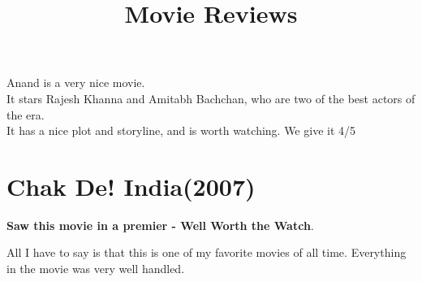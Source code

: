 \documentclass[11pt]{article}
\title{\textbf{Movie Reviews}}
\author{}
\date{}
\begin{document}
\maketitle
{}
Anand is a very nice movie.\\
It stars Rajesh Khanna and Amitabh Bachchan, who are two of the best actors of the era.\\
It has a nice plot and storyline, and is worth watching.
We give it 4/5

\section*{Chak De! India(2007)}
\textbf{Saw this movie in a premier - Well Worth the Watch}.

All I have to say is that this is one of my favorite movies of all time. Everything in the movie was very well handled.
\end{document}
